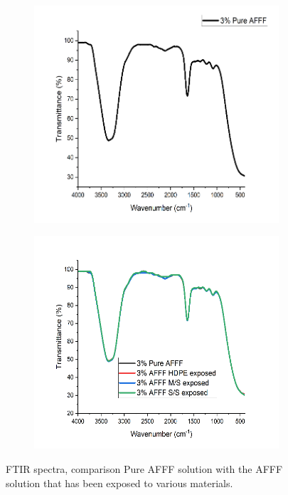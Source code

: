 \documentclass[12pt]{report}
\begin{document}
\begin{figure}[H]
\centering

\begin{subfigure}{.45\textwidth}
    \includegraphics[width=\textwidth]{ftir_spectra.png}
    \caption{}
\end{subfigure}
\begin{subfigure}{.45\textwidth}
    \includegraphics[width=\textwidth]{comparison.png}
    \caption{}
\end{subfigure}

\caption{FTIR spectra, comparison Pure AFFF solution with the AFFF solution that has been exposed to various materials.}
\label{ch5:figure:spectra}
\end{figure}
\end{document}
